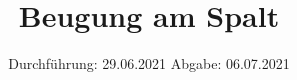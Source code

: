 

\subject{Versuch Nr.V406}
\title{Beugung am Spalt}
\date{%
  Durchführung: 29.06.2021
  \hspace{3em}
  Abgabe: 06.07.2021
}



\maketitle
\thispagestyle{empty}
\tableofcontents
\newpage 



%


%

\nocite{*}

\printbibliography{}


